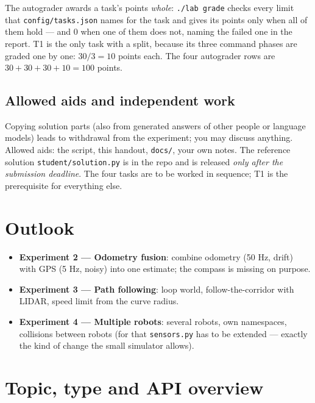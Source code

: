 \documentclass[12pt,a4paper]{scrartcl}
\newcommand{\ordner}[1]{\texttt{#1}}
\newcommand{\kommando}[1]{\texttt{#1}}
\begin{document}
The autograder awards a task's points \emph{whole}: \kommando{./lab grade} checks every limit that
\ordner{config/tasks.json} names for the task and gives its points only when all of them hold — and
0 when one of them does not, naming the failed one in the report. T1 is the only task with a split,
because its three command phases are graded one by one: \(30/3 = 10\) points each. The four
autograder rows are \(30+30+30+10 = 100\) points.
\subsection*{Allowed aids and independent work}
Copying solution parts (also from generated answers of other people or language
models) leads to withdrawal from the experiment; you may discuss anything.
Allowed aids: the script, this handout, \ordner{docs/}, your own notes. The
reference solution \ordner{student/solution.py} is in the repo and is released
\emph{only after the submission deadline}.
The four tasks are to be worked in sequence; T1 is the prerequisite for
everything else.

\section{Outlook}
\begin{itemize}
  \item \textbf{Experiment 2 — Odometry fusion}: combine odometry (50 Hz, drift) with GPS
        (5 Hz, noisy) into one estimate; the compass is missing on purpose.
  \item \textbf{Experiment 3 — Path following}: loop world, follow-the-corridor with
        LIDAR, speed limit from the curve radius.
  \item \textbf{Experiment 4 — Multiple robots}: several robots, own namespaces,
        collisions between robots (for that \ordner{sensors.py} has to be extended
        — exactly the kind of change the small simulator allows).
\end{itemize}

\appendix
\section{Topic, type and API overview}
\end{document}
